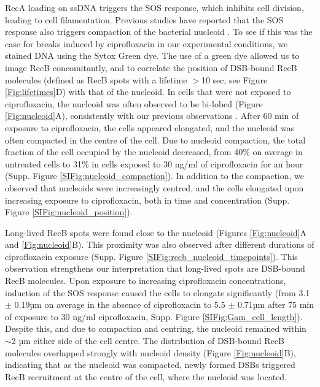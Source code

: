 RecA loading on ssDNA triggers the SOS response, which inhibits cell division, leading to cell filamentation. Previous studies have reported that the SOS response also triggers compaction of the bacterial nucleoid \cite{Odsbu2014}. To see if this was the case for breaks induced by ciprofloxacin in our experimental conditions, we stained DNA using the Sytox Green dye. The use of a green dye allowed us to image RecB concomitantly, and to correlate the position of DSB-bound RecB molecules (defined as RecB spots with a lifetime $>$10 sec, see Figure \ref{Fig:lifetimes}D) with that of the nucleoid. In cells that were not exposed to ciprofloxacin, the nucleoid was often observed to be bi-lobed (Figure \ref{Fig:nucleoid}A), consistently with our previous observations \cite{Lepore2023}. After 60 min of exposure to ciprofloxacin, the cells appeared elongated, and the nucleoid was often compacted in the centre of the cell. Due to nucleoid compaction, the total fraction of the cell occupied by the nucleoid decreased, from 40\% on average in untreated cells to 31\% in cells exposed to 30 ng/ml of ciprofloxacin for an hour (Supp. Figure \ref{SIFig:nucleoid_compaction}). In addition to the compaction, we observed that nucleoids were increasingly centred, and the cells elongated upon increasing exposure to ciprofloxacin, both in time and concentration (Supp. Figure \ref{SIFig:nucleoid_position}).

Long-lived RecB spots were found close to the nucleoid (Figures \ref{Fig:nucleoid}A and \ref{Fig:nucleoid}B). This proximity was also observed after different durations of ciprofloxacin exposure (Supp. Figure \ref{SIFig:recb_nucleoid_timepoints}). This observation strengthens our interpretation that long-lived spots are DSB-bound RecB molecules. Upon exposure to increasing ciprofloxacin concentrations, induction of the SOS response caused the cells to elongate significantly (from 3.1 $\pm$ 0.19µm on average in the absence of ciprofloxacin to 5.5 $\pm$ 0.71µm after 75 min of exposure to 30 ng/ml ciprofloxacin, Supp. Figure \ref{SIFig:Gam_cell_length}). Despite this, and due to compaction and centring, the nucleoid remained within $\sim$2 µm either side of the cell centre. The distribution of DSB-bound RecB molecules overlapped strongly with nucleoid density (Figure \ref{Fig:nucleoid}B), indicating that as the nucleoid was compacted, newly formed DSBs triggered RecB recruitment at the centre of the cell, where the nucleoid was located.

